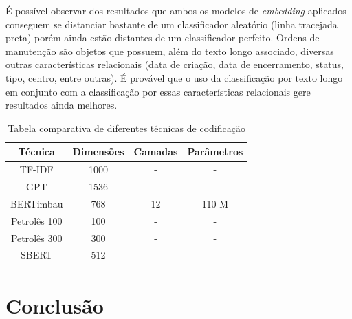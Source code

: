 \documentclass[conference]{IEEEtran}
\begin{document}
    É possível observar dos resultados que ambos os modelos de \textit{embedding} aplicados conseguem se distanciar bastante de um classificador aleatório (linha tracejada preta) porém ainda estão distantes de um classificador perfeito. Ordens de manutenção são objetos que possuem, além do texto longo associado, diversas outras características relacionais (data de criação, data de encerramento, status, tipo, centro, entre outras). É provável que o uso da classificação por texto longo em conjunto com a classificação por essas características relacionais gere resultados ainda melhores.
    
\begin{table}
    \centering
    \caption{Tabela comparativa de diferentes técnicas de codificação}
    \label{tab:my_label}
    \def\arraystretch{1.2}
    \begin{tabular}{cccc} 
        \hline
        Técnica & Dimensões & Camadas & Parâmetros \\ 
        \hline
        TF-IDF & 1000 & -& -\\ 
        \hline
        GPT & 1536 & -& -\\ 
        \hline
        BERTimbau & 768 & 12 & 110 M \\ 
        \hline
        Petrolês 100 & 100 & -& -\\ 
        \hline
        Petrolês 300 & 300 & -& -\\ 
        \hline
        SBERT & 512 & -& -\\ 
        \hline
    \end{tabular}
\end{table}
  
\section{Conclusão}
\end{document}
